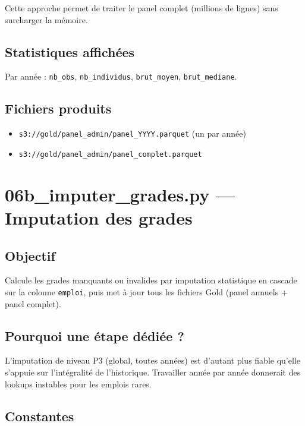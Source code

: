 \documentclass[12pt,a4paper,french]{report}
\newcommand{\bucket}[1]{\texttt{s3://#1}}
\begin{document}
Cette approche permet de traiter le panel complet (millions de lignes) sans
surcharger la mémoire.

\subsection{Statistiques affichées}

Par année : \texttt{nb\_obs}, \texttt{nb\_individus}, \texttt{brut\_moyen},
\texttt{brut\_mediane}.

\subsection{Fichiers produits}

\begin{itemize}[nosep]
  \item \bucket{gold/panel\_admin/panel\_YYYY.parquet} (un par année)
  \item \bucket{gold/panel\_admin/panel\_complet.parquet}
\end{itemize}

\section{06b\_imputer\_grades.py — Imputation des grades}

\subsection{Objectif}

Calcule les grades manquants ou invalides par imputation statistique en
cascade sur la colonne \texttt{emploi}, puis met à jour tous les fichiers
Gold (panel annuels + panel complet).

\subsection{Pourquoi une étape dédiée ?}

L'imputation de niveau P3 (global, toutes années) est d'autant plus fiable
qu'elle s'appuie sur l'intégralité de l'historique. Travailler année par
année donnerait des lookups instables pour les emplois rares.

\subsection{Constantes}
\end{document}
